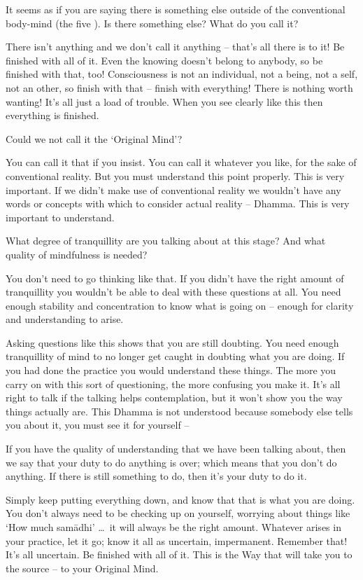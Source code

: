 It seems as if you are saying there is something else outside of the conventional body-mind (the five ). Is there something else? What do you call it?

There isn't anything and we don't call it anything -- that's all there is to it! Be finished with all of it. Even the knowing doesn't belong to anybody, so be finished with that, too! Consciousness is not an individual, not a being, not a self, not an other, so finish with that -- finish with everything! There is nothing worth wanting! It's all just a load of trouble. When you see clearly like this then everything is finished.

Could we not call it the `Original Mind'?

You can call it that if you insist. You can call it whatever you like, for the sake of conventional reality. But you must understand this point properly. This is very important. If we didn't make use of conventional reality we wouldn't have any words or concepts with which to consider actual reality -- Dhamma. This is very important to understand.

What degree of tranquillity are you talking about at this stage? And what quality of mindfulness is needed? 

You don't need to go thinking like that. If you didn't have the right amount of tranquillity you wouldn't be able to deal with these questions at all. You need enough stability and concentration to know what is going on -- enough for clarity and understanding to arise.

Asking questions like this shows that you are still doubting. You need enough tranquillity of mind to no longer get caught in doubting what you are doing. If you had done the practice you would understand these things. The more you carry on with this sort of questioning, the more confusing you make it. It's all right to talk if the talking helps contemplation, but it won't show you the way things actually are. This Dhamma is not understood because somebody else tells you about it, you must see it for yourself -- 

If you have the quality of understanding that we have been talking about, then we say that your duty to do anything is over; which means that you don't do anything. If there is still something to do, then it's your duty to do it.

Simply keep putting everything down, and know that that is what you are doing. You don't always need to be checking up on yourself, worrying about things like `How much sam\=adhi' \ldots\ it will always be the right amount. Whatever arises in your practice, let it go; know it all as uncertain, impermanent. Remember that! It's all uncertain. Be finished with all of it. This is the Way that will take you to the source -- to your Original Mind.

